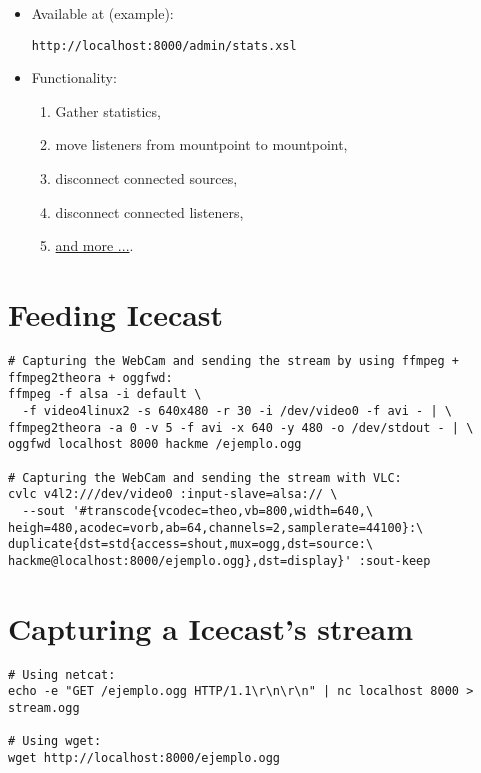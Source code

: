 \begin{itemize}
\item Available at (example):
\begin{verbatim}
http://localhost:8000/admin/stats.xsl
\end{verbatim}
\item Functionality:
\begin{enumerate}
\item Gather statistics,
\item move listeners from mountpoint to mountpoint,
\item disconnect connected sources,
\item disconnect connected listeners,
\item
  \href{http://www.icecast.org/docs/icecast-trunk/icecast2_admin.html}{and
    more ...}.
\end{enumerate}
\end{itemize}


\section{Feeding Icecast}
\lstset{language=bash}
\begin{lstlisting}
# Capturing the WebCam and sending the stream by using ffmpeg + ffmpeg2theora + oggfwd:
ffmpeg -f alsa -i default \
  -f video4linux2 -s 640x480 -r 30 -i /dev/video0 -f avi - | \
ffmpeg2theora -a 0 -v 5 -f avi -x 640 -y 480 -o /dev/stdout - | \
oggfwd localhost 8000 hackme /ejemplo.ogg

# Capturing the WebCam and sending the stream with VLC:
cvlc v4l2:///dev/video0 :input-slave=alsa:// \
  --sout '#transcode{vcodec=theo,vb=800,width=640,\
heigh=480,acodec=vorb,ab=64,channels=2,samplerate=44100}:\
duplicate{dst=std{access=shout,mux=ogg,dst=source:\
hackme@localhost:8000/ejemplo.ogg},dst=display}' :sout-keep
\end{lstlisting}

\section{Capturing a Icecast's stream}
\label{sec:captura_stream_icecast}
\begin{verbatim}
# Using netcat:
echo -e "GET /ejemplo.ogg HTTP/1.1\r\n\r\n" | nc localhost 8000 > stream.ogg

# Using wget:
wget http://localhost:8000/ejemplo.ogg
\end{verbatim}


